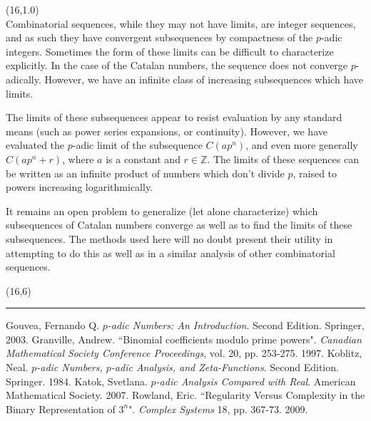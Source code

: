 \documentclass[a0]{a0poster}
\theoremstyle{definition}
\def\LHead#1{\noindent{\bf \LARGE\color{DarkBlue} #1}\smallskip}
\newcommand{\integers}{\mathbb{Z}}
\begin{document}
\begin{textblock}{7}(16,1.0)
  \LHead{Conclusion}\\

\indent Combinatorial sequences, while they may not have limits, are integer sequences, and as such they have convergent subsequences by compactness of the $p$-adic integers. Sometimes the form of these limits can be difficult to characterize explicitly. In the case of the Catalan numbers, the sequence does not converge $p$-adically. However, we have an infinite class of increasing subsequences which have limits. 

\indent The limits of these subsequences appear to resist evaluation by any standard means (such as power series expansions, or continuity). However, we have evaluated the $p$-adic limit of the subsequence $C(ap^n)$, and even more generally $C(ap^n+r)$, where $a$ is a constant and $r\in\integers$. The limits of these sequences can be written as an infinite product of numbers which don't divide $p$, raised to powers increasing logarithmically.


\indent It remains an open problem to generalize (let alone characterize) which  subsequences of Catalan numbers converge as well as to find the limits of these subsequences. The methods used here will no doubt present their utility in attempting to do this as well as in a similar analysis of other combinatorial sequences. 

\end{textblock}
\begin{textblock}{7}(16,6)
  \renewcommand\refname{{\LARGE\color{DarkBlue} References}}
  \hrule
 \begin{thebibliography}{aaaa} 
 Gouvea, Fernando Q.
\textit{$p$-adic Numbers: An Introduction}. Second Edition.
Springer, 2003.
 Granville, Andrew.
``Binomial coefficients modulo prime powers". \textit{Canadian Mathematical Society Conference Proceedings}, vol. 20, pp. 253-275. 1997.
 Koblitz, Neal.
\textit{$p$-adic Numbers, $p$-adic Analysis, and Zeta-Functions}. Second Edition. Springer. 1984.
 Katok, Svetlana.
\textit{$p$-adic Analysis Compared with Real}. American Mathematical Society. 2007.
 Rowland, Eric.
``Regularity Versus Complexity in the Binary Representation of $3^n$". \textit{Complex Systems} 18, pp. 367-73. 2009. 
\end{thebibliography}

  \end{textblock}
\end{document}
